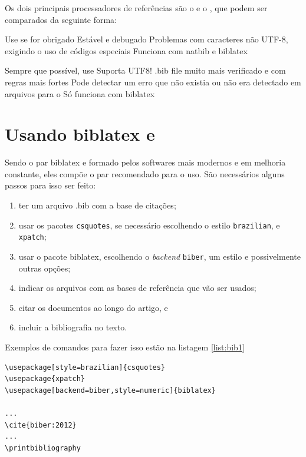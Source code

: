 Os dois principais processadores de referências são o  e o  , que podem ser comparados da seguinte forma\parencite{biber:2012}:
\begin{multicols}{2}
\begin{outline}
    \1 
    \2 Use se for obrigado
    \2 Estável e debugado
    \2 Problemas com caracteres não UTF-8, exigindo o uso de códigos especiais
    \2 Funciona com natbib e biblatex
\end{outline}
\columnbreak
\begin{outline}
    \1 
    \2 Sempre que possível, use
    \2 Suporta UTF8!
    \2 .bib file muito mais verificado e com regras mais fortes
    \3 Pode detectar um erro que não existia ou não era detectado em arquivos para o 
    \2 Só funciona com biblatex
\end{outline}
\end{multicols}



\section{Usando biblatex e  }

Sendo o par biblatex e  formado pelos
softwares mais modernos e em melhoria constante, eles compõe
o par recomendado para o uso. São necessários alguns passos 
para isso ser feito:
\begin{enumerate}
    \item ter um arquivo .bib com a base de citações;
    \item usar os pacotes \lstinline|csquotes|, se necessário escolhendo o estilo \lstinline|brazilian|, e \lstinline|xpatch|;
    \item usar o pacote biblatex, escolhendo o \textit{backend} \lstinline|biber|, um estilo e possivelmente outras opções; 
    \item indicar os arquivos com as bases de referência que vão ser usados;
    \item citar os documentos ao longo do artigo, e
    \item incluir a bibliografia no texto.
\end{enumerate}
Exemplos de comandos para fazer isso estão na listagem \ref{list:bib1}

\begin{lstlisting}[caption=Exemplo de uso de biblatex,label=list:bib1]
\usepackage[style=brazilian]{csquotes}
\usepackage{xpatch}
\usepackage[backend=biber,style=numeric]{biblatex}

...
\cite{biber:2012}
...
\printbibliography
\end{lstlisting}


